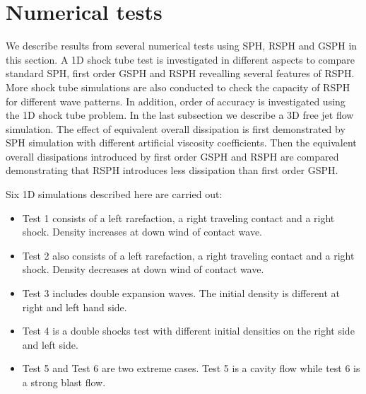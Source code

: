 \documentclass[review]{elsarticle}
\begin{document}
\section{Numerical tests} \label{sec:numericaltests}
We describe results from several numerical tests using SPH, RSPH and GSPH in this section.
A 1D shock tube test is investigated in different aspects to compare standard SPH, first order GSPH and RSPH revealling several features of RSPH. More shock tube simulations are also conducted to check the capacity of RSPH for different wave patterns. In addition, order of accuracy is investigated using the 1D shock tube problem. In the last subsection we describe a 3D free jet flow simulation. The effect of equivalent overall dissipation is first demonstrated by SPH simulation with different artificial viscosity coefficients. Then the equivalent overall dissipations introduced by first order GSPH and RSPH are compared demonstrating that RSPH introduces less dissipation than first order GSPH.

Six 1D simulations described here are carried out:
\begin{itemize}%
\item Test 1 consists of a left rarefaction, a right traveling contact and a right shock. Density increases at down wind of contact wave. 
\item Test 2 also consists of a left rarefaction, a right traveling contact and a right shock. Density decreases at down wind of contact wave. 
\item Test 3 includes double expansion waves. The initial density is different at right and left hand side. 
\item Test 4 is a double shocks test with different initial densities on the right side and left side.
\item Test 5 and Test 6 are two extreme cases. Test 5 is a cavity flow while test 6 is a strong blast flow.
\end{itemize}
\end{document}

